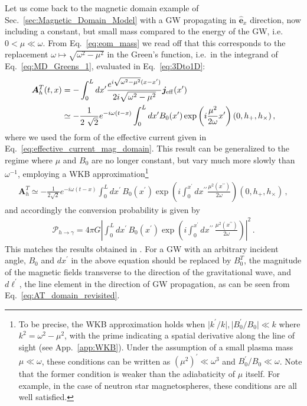 \documentclass[a4paper,11pt]{article}
\begin{document}
Let us come back to the magnetic domain example of Sec.~\ref{sec:Magnetic_Domain_Model} with a GW propagating in $ \hat{\bm e}_{x} $ direction, now including a constant, but small mass compared to the energy of the GW, i.e. $ 0 < \mu  \ll \omega $.
%
From Eq.~\eqref{eq:eom_mass} we read off that this corresponds to the replacement $\omega \mapsto \sqrt{\omega^2 - \mu^2}$ in the Green's function, i.e.\ in the integrand of Eq.~\eqref{eq:MD_Greens_1}, evaluated in Eq.~\eqref{eq:3Dto1D}:
%
\begin{equation}
\begin{aligned}
    \bm{A}_{h}^{T}(t,x) & = - \int_{0}^{L} dx^{\prime} \frac{ e^{i \sqrt{\omega^{2} - \mu^{2}} ( x - x^{\prime} ) } }{ 2 i \sqrt{\omega^{2} - \mu^{2}} } \bm{j}_{\rm eff}(x^{\prime})  \\
    & \simeq - \frac{1}{ 2\ \sqrt{2} }  e^{-i \omega (t-x) } \int_{0}^{L} dx^{\prime} B_{0}(x^{\prime}) \exp \left( i \frac{\mu^{2}}{2 \omega} x^{\prime} \right) (0, h_+, h_\times) \,,
\end{aligned}
\end{equation}
%
where we used the form of the effective current given in Eq.~\eqref{eq:effective_current_mag_domain}.
%
This result can be generalized to the regime where $\mu$ and $ B_{0} $ are no longer constant, but vary much more slowly than $\omega^{-1}$,
employing a WKB approximation\footnote{
To be precise, the WKB approximation holds when $\vert k^{\prime} / k \vert , \vert  B_{0}^{\prime} / B_{0} \vert  \ll k $ where $ k^{2} = \omega^{2} - \mu^{2} $, with the prime indicating a spatial derivative along the line of sight (see App.~\ref{app:WKB}).
%
Under the assumption of a small plasma mass $ \mu \ll \omega $, these conditions can be written as
$ (\mu^{2})^{\prime} \ll \omega^{3}$ and $ B_{0}^{\prime} / B_{0} \ll \omega$.
Note that the former condition is weaker than the adiabaticity of $ \mu $ itself.
%
For example, in the case of neutron star magnetospheres, these conditions are all well satisfied.
}
\begin{align}
    \bm{A}_{h}^{T} \simeq - \frac{1}{ 2\sqrt{2} }  e^{-i \omega (t-x) } \int_{0}^{L} dx^{\prime} \, B_{0}(x^{\prime}) \exp \left( i \int_{0}^{x^{\prime}} dx^{\prime\prime} \frac{\mu^{2}(x^{\prime\prime})}{2 \omega}  \right) (0, h_+, h_\times) \,,
    \label{eq:Ah_WKB}
\end{align}
%
and accordingly the conversion probability is given by
%
\begin{align}
    \mathcal{P}_{h \rightarrow \gamma}
    = 4 \pi G \left\vert \int_{0}^{L} dx^{\prime} \,  B_{0}(x^{\prime}) \exp \left( i \int_{0}^{x^{\prime}} dx^{\prime\prime} \, \frac{\mu^{2}(x^{\prime\prime})}{2 \omega}   \right) \right\vert^{2}\,.
    \label{eq:Ph_WKB} 
\end{align}
%
This matches the results obtained in \cite{Raffelt:1987im}. For a GW with an arbitrary incident angle, $B_{0}$ and $dx^{\prime}$ in the above equation should be replaced by $B_{0}^{T}$, the magnitude of the magnetic fields transverse to the direction of the gravitational wave, and $d\ell^{\prime} $, the line element in the direction of GW propagation, as can be seen from Eq.~\eqref{eq:AT_domain_revisited}.
\end{document}
